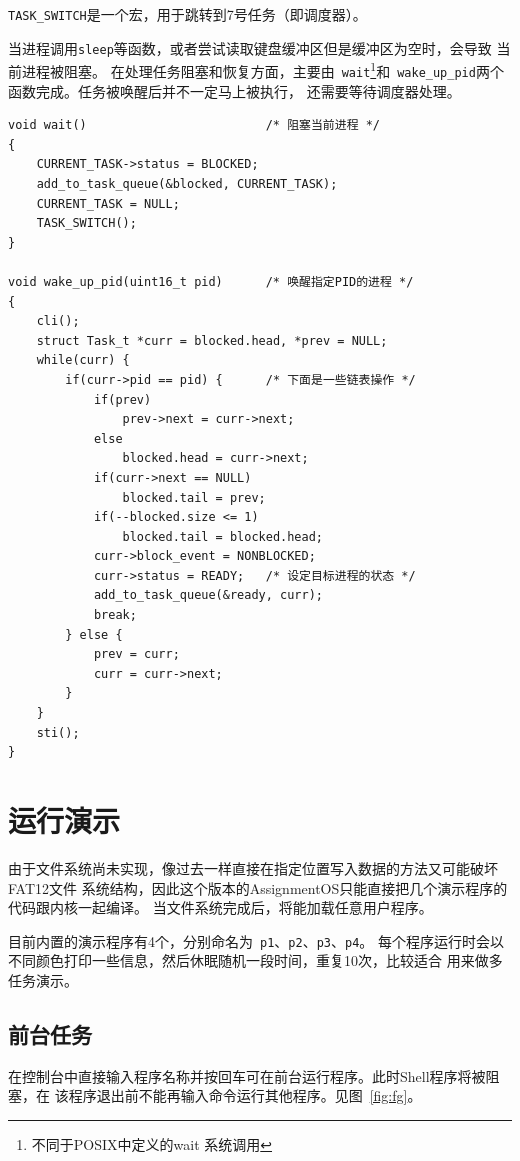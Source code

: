 \documentclass[a4paper, adobefonts]{ctexart}
\begin{document}
\verb|TASK_SWITCH|是一个宏，用于跳转到7号任务（即调度器）。

当进程调用\verb|sleep|等函数，或者尝试读取键盘缓冲区但是缓冲区为空时，会导致
当前进程被阻塞。
在处理任务阻塞和恢复方面，主要由~\verb|wait|\footnote{不同于POSIX中定义的wait
系统调用}和~\verb|wake_up_pid|两个函数完成。任务被唤醒后并不一定马上被执行，
还需要等待调度器处理。

\begin{verbatim}
void wait()                         /* 阻塞当前进程 */
{
    CURRENT_TASK->status = BLOCKED;
    add_to_task_queue(&blocked, CURRENT_TASK);
    CURRENT_TASK = NULL;
    TASK_SWITCH();
}

void wake_up_pid(uint16_t pid)      /* 唤醒指定PID的进程 */
{
    cli();
    struct Task_t *curr = blocked.head, *prev = NULL;
    while(curr) {
        if(curr->pid == pid) {      /* 下面是一些链表操作 */
            if(prev)
                prev->next = curr->next;
            else
                blocked.head = curr->next;
            if(curr->next == NULL)
                blocked.tail = prev;
            if(--blocked.size <= 1)
                blocked.tail = blocked.head;
            curr->block_event = NONBLOCKED;
            curr->status = READY;   /* 设定目标进程的状态 */
            add_to_task_queue(&ready, curr);
            break;
        } else {
            prev = curr;
            curr = curr->next;
        }
    }
    sti();
}
\end{verbatim}

\section{运行演示}
由于文件系统尚未实现，像过去一样直接在指定位置写入数据的方法又可能破坏FAT12文件
系统结构，因此这个版本的AssignmentOS只能直接把几个演示程序的代码跟内核一起编译。
当文件系统完成后，将能加载任意用户程序。

目前内置的演示程序有4个，分别命名为~\verb|p1|、\verb|p2|、\verb|p3|、\verb|p4|。
每个程序运行时会以不同颜色打印一些信息，然后休眠随机一段时间，重复10次，比较适合
用来做多任务演示。

\subsection{前台任务}
在控制台中直接输入程序名称并按回车可在前台运行程序。此时Shell程序将被阻塞，在
该程序退出前不能再输入命令运行其他程序。见图~\ref{fig:fg}。
\end{document}
